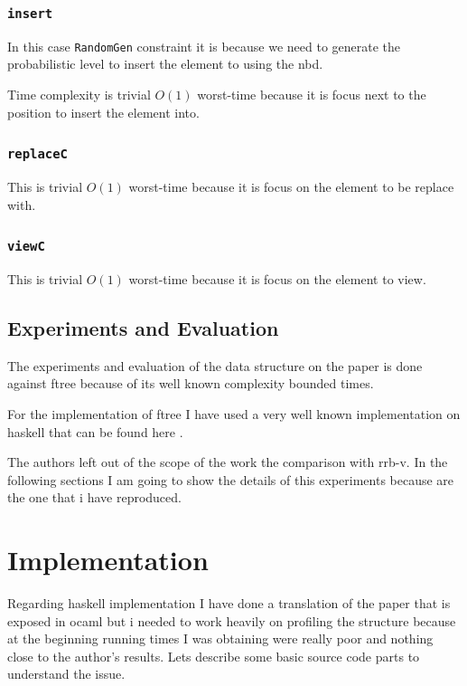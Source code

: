 \documentclass[12pt, a4paper]{article}
\begin{document}
\subsubsection{%
 \texorpdfstring{\texttt{insert}}%
 {-{}-enable-so-version}}

 In this case \texttt{RandomGen} constraint it is because we need to generate the probabilistic level to insert the element to using the \acrshort{nbd}.

 Time complexity is trivial $O(1)$ worst-time because it is focus next to the position to insert the element into.

\subsubsection{%
 \texorpdfstring{\texttt{replaceC}}%
 {-{}-enable-so-version}}

 This is trivial $O(1)$ worst-time because it is focus on the element to be replace with.

\subsubsection{%
 \texorpdfstring{\texttt{viewC}}%
 {-{}-enable-so-version}}

 This is trivial $O(1)$ worst-time because it is focus on the element to view.

\subsection{Experiments and Evaluation}
The experiments and evaluation of the data structure on the paper is done against \acrfull{ftree} because of its well known complexity bounded times.

For the implementation of \acrshort{ftree} I have used a very well known implementation on \acrshort{haskell} that can be found here \cite{ftree}.

The authors left out of the scope of the work the comparison with \acrfull{rrb-v}. In the following sections I am going to show the details of this experiments because are the one that i have reproduced.

\section{Implementation}\label{sec:impl}
Regarding \acrshort{haskell} implementation I have done a translation of the paper that is exposed in \acrshort{ocaml} but i needed to work heavily on profiling the structure because at the beginning running times I was obtaining were really poor and nothing close to the author's results. Lets describe some basic source code parts to understand the issue.
\end{document}
